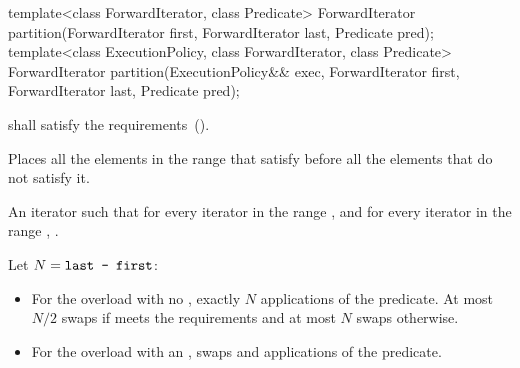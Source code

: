 %
\begin{itemdecl}
template<class ForwardIterator, class Predicate>
  ForwardIterator
    partition(ForwardIterator first, ForwardIterator last, Predicate pred);
template<class ExecutionPolicy, class ForwardIterator, class Predicate>
  ForwardIterator
    partition(ExecutionPolicy&& exec,
              ForwardIterator first, ForwardIterator last, Predicate pred);
\end{itemdecl}

\begin{itemdescr}
\pnum
\requires
{} shall satisfy the
 requirements~().

\pnum
\effects Places all the elements in the range  that satisfy  before all the elements that do not satisfy it.

\pnum
\returns An iterator  such that for every iterator  in the range
 , and for every iterator  in the
range , .

\pnum
\complexity Let $N = \texttt{last - first}$:
\begin{itemize}
\item For the overload with no , exactly $N$ applications
of the predicate.  At most $N / 2$ swaps if  meets the
 requirements and at most $N$ swaps otherwise.
\item For the overload with an ,
 swaps and  applications of the predicate.
\end{itemize}
\end{itemdescr}


